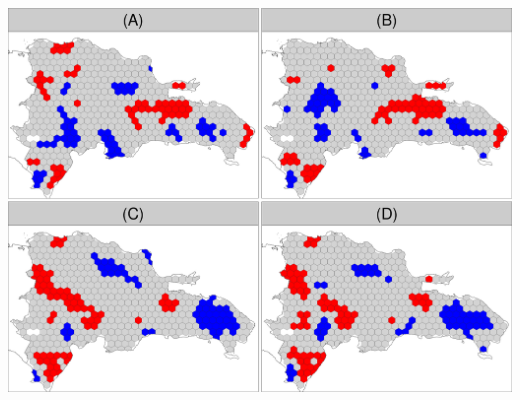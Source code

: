 \documentclass[10pt,landscape,a3paper]{article}
\begin{document}
\begin{center}\includegraphics{img/modelling/lta-esda-13} \end{center}
\end{document}
